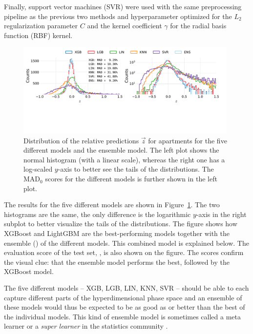 Finally, support vector machines (SVR) were used with the same preprocessing pipeline as the previous two methods and hyperparameter optimized for the $L_2$ regularization parameter $C$ and the kernel coefficient $\gamma$ for the radial basis function (RBF) kernel. 

\begin{figure}[ht!]
  \centerfloat
  \includegraphics[draft=false, width=0.98\textwidth, trim=10 130 40 10, clip]{figures/housing/Ejerlejlighed_v19_cut_all_Ncols_all_all_models.pdf}
  \caption[Performance Comparison of Multiple Models for Apartments]
          {Distribution of the relative predictions $\vec{z}$ for apartments for the five different models and the ensemble model. The left plot shows the normal histogram (with a linear scale), whereas the right one has a log-scaled $y$-axis to better see the tails of the distributions. The $\mathrm{MAD}_0$ scores for the different models is further shown in the left plot.} 
  \label{fig:h:multiple_models}
\end{figure}

The results for the five different models are shown in Figure~\ref{fig:h:multiple_models}. The two histograms are the same, the only difference is the logarithmic $y$-axis in the right subplot to better visualize the tails of the distributions. The figure shows how XGBoost and LightGBM are the best-performing models together with the ensemble () of the different models. This combined model is explained below. The evaluation score of the test set, , is also shown on the figure. The scores confirm the visual clue: that the ensemble model performs the best, followed by the XGBoost model.


The five different models -- XGB, LGB, LIN, KNN, SVR -- should be able to each capture different parts of the hyperdimensional phase space and an ensemble of these models would thus be expected to be as good as or better than the best of the individual models. This kind of ensemble model is sometimes called a meta learner or a \emph{super learner} in the statistics community \autocite{vanSuperLearner2007}. 

